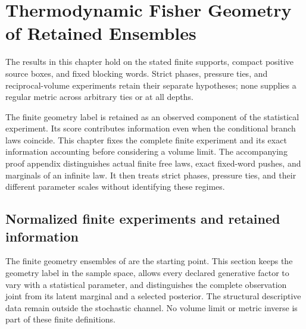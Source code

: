 \begingroup

\chapter[Thermodynamic Fisher Geometry of Retained Ensembles]{Thermodynamic Fisher Geometry\\of Retained Ensembles}
\label{ch:thermodynamic-fisher-draft}

The results in this chapter hold on the stated finite supports, compact
positive source boxes, and fixed blocking words. Strict phases, pressure
ties, and reciprocal-volume experiments retain their separate hypotheses;
none supplies a regular metric across arbitrary ties or at all depths.

The finite geometry label is retained as an observed component of the
statistical experiment. Its score contributes information even when the
conditional branch laws coincide. This chapter fixes the complete finite
experiment and its exact information accounting before considering a
volume limit. The accompanying proof appendix distinguishes actual
finite free laws, exact fixed-word pushes, and marginals of an infinite
law. It then treats strict phases, pressure ties, and their different
parameter scales without identifying these regimes.\thermoestablishedstatus


\section{Normalized finite experiments and retained information}
\label{sec:rg-thermo-finite-experiment}

The finite geometry ensembles of  are the
starting point. This section keeps the geometry label in the sample space,
allows every declared generative factor to vary with a statistical
parameter, and distinguishes the complete observation joint from its
latent marginal and a selected posterior. The structural descriptive data
remain outside the stochastic channel. No volume limit or metric inverse
is part of these finite definitions. 

